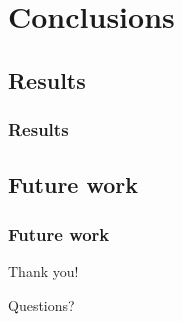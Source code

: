 \documentclass{beamer}
\begin{document}
    \section{Conclusions}
    \label{sec:conclusions}
        \frame{\sectionpage}

        \subsection{Results}
        \label{subsec:results}
            \begin{frame}
                \frametitle{Results}
            \end{frame}


        \subsection{Future work}
        \label{subsec:future-work}
            \begin{frame}
                \frametitle{Future work}
            \end{frame}


        \begin{frame}[plain]
            \begin{center}
                \par{\Huge{Thank you!}}
                \vspace{2.0cm}
                \par{\Huge{Questions?}}
            \end{center}
        \end{frame}
\end{document}
